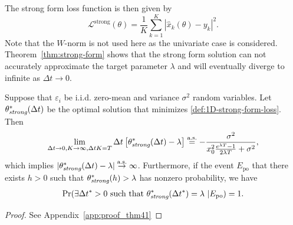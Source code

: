 \documentclass[final]{siamltex}
\begin{document}
The strong form loss function is then given by
\begin{equation} \label{def:1D-strong-form-loss}
    \mathcal{L}^\text{strong}(\theta) = \frac{1}{K}\sum_{k=1}^K | \widehat{x}_k(\theta) - y_k|^2.
\end{equation}
Note that the $W$-norm is not used here as the univariate case is considered.
Theorem~\ref{thm:strong-form} shows that the strong form solution can not accurately approximate the target parameter $\lambda$ and will eventually diverge to infinite as $\Delta t \to 0$.
\begin{theorem} \label{thm:strong-form}
    Suppose that $\varepsilon_i$ be i.i.d. zero-mean and variance $\sigma^2$ random variables.
    Let $\theta_\emph{\text{strong}}^*(\Delta t)$ be the optimal solution that minimizes \eqref{def:1D-strong-form-loss}.
    Then 
    \begin{equation} \label{eqn:thm-strong-limit}
        \lim_{\Delta t \to 0, K\to \infty, \Delta t K = T} \Delta t\left[\theta_\emph{\text{strong}}^*(\Delta t) - \lambda\right]  \overset{\text{a.s.}}{=} - \frac{\sigma^2}{x_0^2\frac{e^{\lambda T}-1}{2\lambda T}+\sigma^2},
    \end{equation}
    which implies 
    $|\theta_\emph{\text{strong}}^*(\Delta t) - \lambda | \overset{\text{a.s.}}{\to} \infty$.
    Furthermore, if the event $E_\text{po}$ that there exists $h >0$ such that $\theta_\emph{\text{strong}}^*(h) > \lambda$ has nonzero probability, 
    we have 
    \begin{align*}
        \text{Pr}(\exists \Delta t^* >0 \ \text{such that} \ \theta_\emph{\text{strong}}^*(\Delta t^*) = \lambda \ | E_\text{po}) = 1.
    \end{align*}
\end{theorem}

\begin{proof}
    See Appendix~\ref{app:proof_thm41}
\end{proof}
\end{document}
